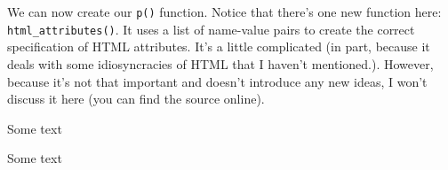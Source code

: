 We can now create our \texttt{p()} function. Notice that there's one new
function here: \texttt{html\_attributes()}. It uses a list of name-value
pairs to create the correct specification of HTML attributes. It's a
little complicated (in part, because it deals with some idiosyncracies
of HTML that I haven't mentioned.). However, because it's not that
important and doesn't introduce any new ideas, I won't discuss it here
(you can find the source online).

\begin{Shaded}
\begin{Highlighting}[]
\NormalTok{(}\NormalTok{, } \NormalTok{)}
\StringTok{ }
\StringTok{ }
\StringTok{ }\NormalTok{(}
\StringTok{ }\NormalTok{(}\NormalTok{(}

  \NormalTok{(}\NormalTok{(}
    \NormalTok{,}
     \NormalTok{),}
\NormalTok{  ))}
\NormalTok{\}}

\NormalTok{(}\NormalTok{)}
\end{Highlighting}
\end{Shaded}

Some text

\begin{Shaded}
\begin{Highlighting}[]
\NormalTok{(}\NormalTok{, } \NormalTok{)}
\end{Highlighting}
\end{Shaded}

Some text

\begin{Shaded}
\begin{Highlighting}[]
\NormalTok{(}\NormalTok{, } \NormalTok{)}
\end{Highlighting}
\end{Shaded}

